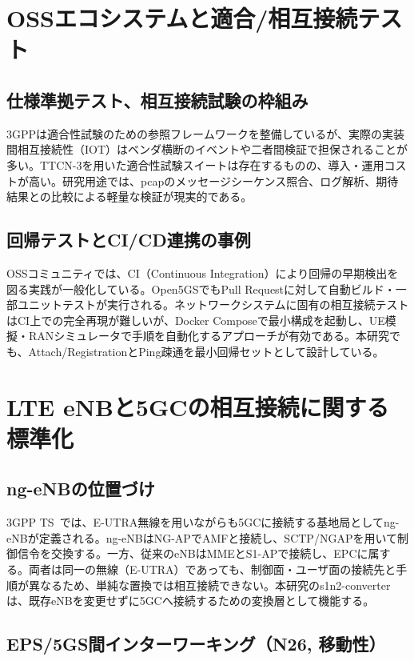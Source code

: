 \section{OSSエコシステムと適合/相互接続テスト}

\subsection{仕様準拠テスト、相互接続試験の枠組み}

3GPPは適合性試験のための参照フレームワークを整備しているが、実際の実装間相互接続性（IOT）はベンダ横断のイベントや二者間検証で担保されることが多い。TTCN-3を用いた適合性試験スイートは存在するものの、導入・運用コストが高い。研究用途では、pcapのメッセージシーケンス照合、ログ解析、期待結果との比較による軽量な検証が現実的である。

\subsection{回帰テストとCI/CD連携の事例}

OSSコミュニティでは、CI（Continuous Integration）により回帰の早期検出を図る実践が一般化している。Open5GSでもPull Requestに対して自動ビルド・一部ユニットテストが実行される。ネットワークシステムに固有の相互接続テストはCI上での完全再現が難しいが、Docker Composeで最小構成を起動し、UE模擬・RANシミュレータで手順を自動化するアプローチが有効である。本研究でも、Attach/RegistrationとPing疎通を最小回帰セットとして設計している。

\section{LTE eNBと5GCの相互接続に関する標準化}

\subsection{ng-eNBの位置づけ}

3GPP TS~\cite{threegpp-23501}では、E-UTRA無線を用いながらも5GCに接続する基地局としてng-eNBが定義される。ng-eNBはNG-APでAMFと接続し、SCTP/NGAPを用いて制御信令を交換する。一方、従来のeNBはMMEとS1-APで接続し、EPCに属する。両者は同一の無線（E-UTRA）であっても、制御面・ユーザ面の接続先と手順が異なるため、単純な置換では相互接続できない。本研究のs1n2-converterは、既存eNBを変更せずに5GCへ接続するための変換層として機能する。

\subsection{EPS/5GS間インターワーキング（N26, 移動性）}

